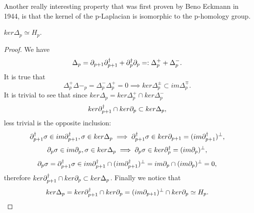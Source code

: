\documentclass[../1.tex]{subfiles}
\begin{document}
    Another really interesting property that was first proven by Beno Eckmann in 1944, is that the kernel of the p-Laplacian
    is isomorphic to the p-homology group.

    \begin{thm}
        $ker\Delta_p \simeq H_p$.
    \end{thm}
    \begin{proof}
        We have \[ \Delta_p = \partial_{p+1}\partial^\dagger_{p+1} + \partial^\dagger_p\partial_p =: \Delta^+_p + \Delta^-_p.\]
        It is true that
        \[  \Delta^+_p\Delta-_p = \Delta^-_p\Delta^+_p = 0\implies ker\Delta^{\pm}_p \subset im\Delta^{\mp}_p.\]
        It is trivial to see that since $ker\Delta_p = ker\Delta^+_p \cap ker\Delta^-_p $
        \[ ker\partial^\dagger_{p+1} \cap ker\partial_p \subset ker\Delta_p,\] less trivial is the opposite inclusion:
        \[ \partial^\dagger_{p+1}\sigma \in im\partial^\dagger_{p+1},\sigma \in ker\Delta_p \implies \partial^\dagger_{p+1}\sigma \in ker\partial_{p+1} = (im\partial^\dagger_{p+1})^\perp,\]
        \[ \partial_p\sigma \in im\partial_p,\sigma \in ker\Delta_p \implies \partial_p\sigma \in ker\partial^\dagger_p= (im\partial_p)^\perp,\]
        \[ \partial_p\sigma = \partial^\dagger_{p+1}\sigma \in im\partial^\dagger_{p+1} \cap (im\partial^\dagger_{p+1})^\perp = im\partial_p \cap (im\partial_p)^\perp = 0,\]
        therefore $ker\partial^\dagger_{p+1} \cap ker\partial_p \subset ker\Delta_p$. Finally we notice that
        \[ ker\Delta_p = ker\partial^\dagger_{p+1} \cap ker\partial_p = (im\partial_{p+1})^\perp \cap ker\partial_p \simeq H_p.\]
    \end{proof}
\end{document}
